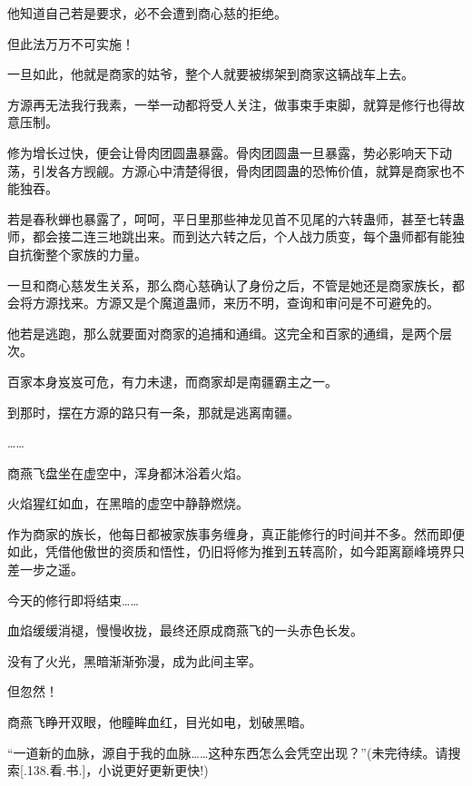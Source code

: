 \begin{this_body}
他知道自己若是要求，必不会遭到商心慈的拒绝。

但此法万万不可实施！

一旦如此，他就是商家的姑爷，整个人就要被绑架到商家这辆战车上去。

方源再无法我行我素，一举一动都将受人关注，做事束手束脚，就算是修行也得故意压制。

修为增长过快，便会让骨肉团圆蛊暴露。骨肉团圆蛊一旦暴露，势必影响天下动荡，引发各方觊觎。方源心中清楚得很，骨肉团圆蛊的恐怖价值，就算是商家也不能独吞。

若是春秋蝉也暴露了，呵呵，平日里那些神龙见首不见尾的六转蛊师，甚至七转蛊师，都会接二连三地跳出来。而到达六转之后，个人战力质变，每个蛊师都有能独自抗衡整个家族的力量。

一旦和商心慈发生关系，那么商心慈确认了身份之后，不管是她还是商家族长，都会将方源找来。方源又是个魔道蛊师，来历不明，查询和审问是不可避免的。

他若是逃跑，那么就要面对商家的追捕和通缉。这完全和百家的通缉，是两个层次。

百家本身岌岌可危，有力未逮，而商家却是南疆霸主之一。

到那时，摆在方源的路只有一条，那就是逃离南疆。

……

商燕飞盘坐在虚空中，浑身都沐浴着火焰。

火焰猩红如血，在黑暗的虚空中静静燃烧。

作为商家的族长，他每日都被家族事务缠身，真正能修行的时间并不多。然而即便如此，凭借他傲世的资质和悟性，仍旧将修为推到五转高阶，如今距离巅峰境界只差一步之遥。

今天的修行即将结束……

血焰缓缓消褪，慢慢收拢，最终还原成商燕飞的一头赤色长发。

没有了火光，黑暗渐渐弥漫，成为此间主宰。

但忽然！

商燕飞睁开双眼，他瞳眸血红，目光如电，划破黑暗。

“一道新的血脉，源自于我的血脉……这种东西怎么会凭空出现？”(未完待续。请搜索[.138.看.书.]，小说更好更新更快!)

\end{this_body}

